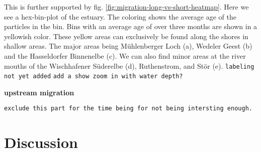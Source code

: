 This is further supported by fig. \ref{fig:migration-long-vs-short-heatmap}.
Here we see a hex-bin-plot of the estuary. The coloring shows the average age of the particles in the bin.
Bins with an average age of over three months are shown in a yellowish color.
These yellow areas can exclusively be found along the shores in shallow areas.
The major areas being Mühlenberger Loch (a), Wedeler Geest (b) and the Hasseldorfer Binnenelbe (c). We can also find minor areas at the river mouths of the Wischhafener Süderelbe (d), Ruthenstrom, and Stör (e). \texttt{labeling not yet added}
\texttt{add a show zoom in with water depth?}





\textbf{upstream migration}

\texttt{exclude this part for the time being for not being intersting enough.}






\section*{Discussion}

